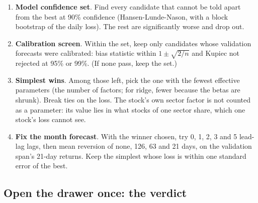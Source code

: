 \documentclass[11pt,a4paper]{article}
\begin{document}
\begin{method}
\begin{enumerate}[leftmargin=1.4em]
  \item \textbf{Model confidence set}. Find every candidate that cannot be told apart from the best at 90\% confidence (Hansen-Lunde-Nason, with a block bootstrap of the daily loss). The rest are significantly worse and drop out.
  \item \textbf{Calibration screen}. Within the set, keep only candidates whose validation forecasts were calibrated: bias statistic within $1\pm\sqrt{2/n}$ and Kupiec not rejected at 95\% or 99\%. (If none pass, keep the set.)
  \item \textbf{Simplest wins}. Among those left, pick the one with the fewest effective parameters (the number of factors; for ridge, fewer because the betas are shrunk). Break ties on the loss. The stock's own sector factor is not counted as a parameter: its value lies in what stocks of one sector share, which one stock's loss cannot see.
  \item \textbf{Fix the month forecast}. With the winner chosen, try 0, 1, 2, 3 and 5 lead-lag lags, then mean reversion of none, 126, 63 and 21 days, on the validation span's 21-day returns. Keep the simplest whose loss is within one standard error of the best.
\end{enumerate}
\end{method}

\subsection{Open the drawer once: the verdict}
\end{document}
